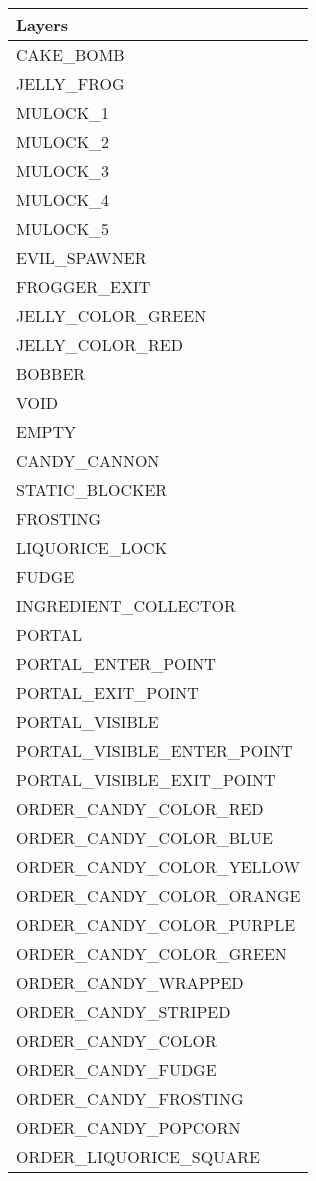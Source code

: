     \begin{tabular}{l}
    \toprule
    \textbf{Layers} \\%
    \midrule
    
    CAKE\_BOMB \\   
    JELLY\_FROG \\ 
    MULOCK\_1 \\   
    MULOCK\_2 \\   
    MULOCK\_3 \\   
    MULOCK\_4 \\   
    MULOCK\_5 \\ 
    
    EVIL\_SPAWNER \\   
    FROGGER\_EXIT \\ 
    JELLY\_COLOR\_GREEN \\   
    JELLY\_COLOR\_RED \\   
    BOBBER \\ 
    
    VOID \\   
    EMPTY \\   
 
    CANDY\_CANNON \\ 
    STATIC\_BLOCKER \\ 
    FROSTING \\   
    LIQUORICE\_LOCK \\   
    FUDGE \\  
    INGREDIENT\_COLLECTOR \\   
    PORTAL \\ 
    PORTAL\_ENTER\_POINT \\   
    PORTAL\_EXIT\_POINT \\  
    PORTAL\_VISIBLE \\  
    PORTAL\_VISIBLE\_ENTER\_POINT \\ 
    PORTAL\_VISIBLE\_EXIT\_POINT \\  
        
      
    
    ORDER\_CANDY\_COLOR\_RED \\ 
    ORDER\_CANDY\_COLOR\_BLUE \\ 
    ORDER\_CANDY\_COLOR\_YELLOW \\ 
    ORDER\_CANDY\_COLOR\_ORANGE \\ 
    ORDER\_CANDY\_COLOR\_PURPLE \\ 
    ORDER\_CANDY\_COLOR\_GREEN \\ 
    ORDER\_CANDY\_WRAPPED \\ 
    ORDER\_CANDY\_STRIPED \\ 
    ORDER\_CANDY\_COLOR \\ 
    ORDER\_CANDY\_FUDGE \\ 
    ORDER\_CANDY\_FROSTING \\ 
    ORDER\_CANDY\_POPCORN \\ 
    ORDER\_LIQUORICE\_SQUARE \\ 


\end{tabular}
